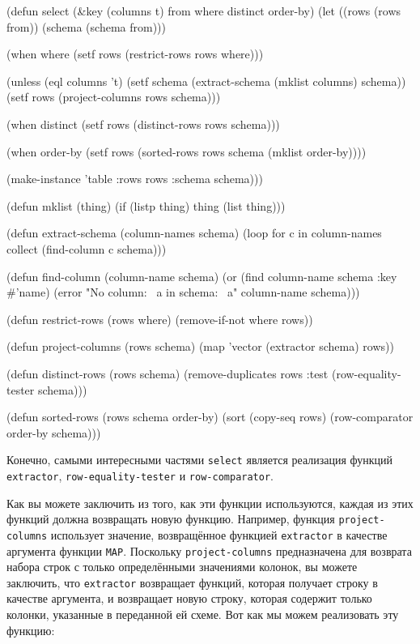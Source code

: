 \begin{myverb}
(defun select (&key (columns t) from where distinct order-by)
  (let ((rows (rows from))
        (schema (schema from)))

    (when where
      (setf rows (restrict-rows rows where)))

    (unless (eql columns 't)
      (setf schema (extract-schema (mklist columns) schema))
      (setf rows (project-columns rows schema)))

    (when distinct
      (setf rows (distinct-rows rows schema)))

    (when order-by
      (setf rows (sorted-rows rows schema (mklist order-by))))

    (make-instance 'table :rows rows :schema schema)))

(defun mklist (thing)
  (if (listp thing) thing (list thing)))

(defun extract-schema (column-names schema)
  (loop for c in column-names collect (find-column c schema)))

(defun find-column (column-name schema)
  (or (find column-name schema :key #'name)
      (error "No column: ~a in schema: ~a" column-name schema)))

(defun restrict-rows (rows where)
  (remove-if-not where rows))

(defun project-columns (rows schema)
  (map 'vector (extractor schema) rows))

(defun distinct-rows (rows schema)
  (remove-duplicates rows :test (row-equality-tester schema)))

(defun sorted-rows (rows schema order-by)
  (sort (copy-seq rows) (row-comparator order-by schema)))
\end{myverb}

Конечно, самыми интересными частями \lstinline{select} является реализация функций
\lstinline{extractor}, \lstinline{row-equality-tester} и \lstinline{row-comparator}.

Как вы можете заключить из того, как эти функции используются, каждая из этих функций
должна возвращать новую функцию.  Например, функция \lstinline{project-columns} использует
значение, возвращённое функцией \lstinline{extractor} в качестве аргумента функции \lstinline{MAP}.
Поскольку \lstinline{project-columns} предназначена для возврата набора строк с только
определёнными значениями колонок, вы можете заключить, что \lstinline{extractor} возвращает
функций, которая получает строку в качестве аргумента, и возвращает новую строку, которая
содержит только колонки, указанные в переданной ей схеме.  Вот как мы можем реализовать
эту функцию:

